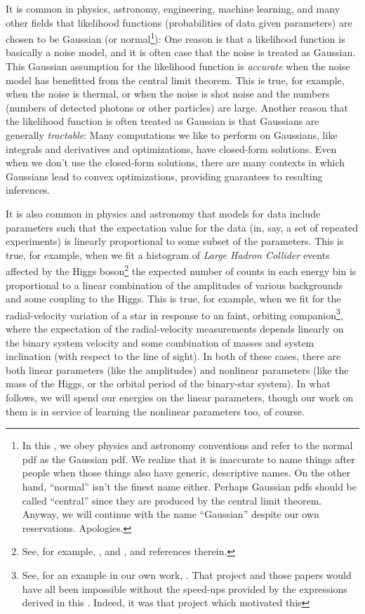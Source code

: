It is common in physics, astronomy, engineering, machine learning, and many other fields that likelihood functions
(probabilities of data given parameters) are chosen to be Gaussian
(or normal\footnote{In this \documentname, we obey physics and astronomy
conventions and refer to the normal pdf as the Gaussian pdf. We realize that it
is inaccurate to name things after people when those things also have generic,
descriptive names. On the other hand, ``normal'' isn't the finest name either.
Perhaps Gaussian pdfs should be called ``central'' since they are produced by
the central limit theorem. Anyway, we will continue with the name ``Gaussian''
despite our own reservations. Apologies.}):
One reason is that a likelihood function is basically a noise model,
and it is often case that the noise is treated as Gaussian.
This Gaussian assumption for the likelihood function is
\emph{accurate} when the noise model has benefitted from the central
limit theorem.
This is true, for example, when the noise is thermal, or when the
noise is shot noise and the numbers (numbers of detected photons or other
particles) are large.
Another reason that the likelihood function is often treated as
Gaussian is that Gaussians are generally \emph{tractable}:
Many computations we like to perform on Gaussians, like integrals and
derivatives and optimizations, have closed-form solutions.
Even when we don't use the closed-form solutions, there are many
contexts in which Gaussians lead to convex optimizations,
providing guarantees to resulting inferences.

It is also common in physics and astronomy that models for data
include parameters such that the expectation value for the data (in,
say, a set of repeated experiments) is linearly proportional to some
subset of the parameters.
This is true, for example, when we fit a histogram of \textsl{Large Hadron
  Collider} events affected by the Higgs boson\footnote{See, for example,
  \cite{atlas}, and \cite{cms}, and references therein.}
the expected number of counts in each
energy bin is proportional to a linear combination of the amplitudes
of various backgrounds and some coupling to the Higgs.
This is true, for example, when we fit for the radial-velocity
variation of a star in response to an faint, orbiting companion\footnote{See,
  for an example in our own work, \cite{Price-Whelan:2017, Price-Whelan:2020}.
  That project and those papers would have all been
  impossible without the speed-ups provided by the expressions derived in this
  \documentname. Indeed, it was that project which motivated this \documentname},
where the expectation of the
radial-velocity measurements depends linearly on the binary system
velocity and some combination of masses and system inclination (with
respect to the line of sight).
In both of these cases, there are both linear parameters (like the
amplitudes) and nonlinear parameters (like the mass of the Higgs, or
the orbital period of the binary-star system).
In what follows, we will spend our energies on the linear parameters,
though our work on them is in service of learning the nonlinear
parameters too, of course.

